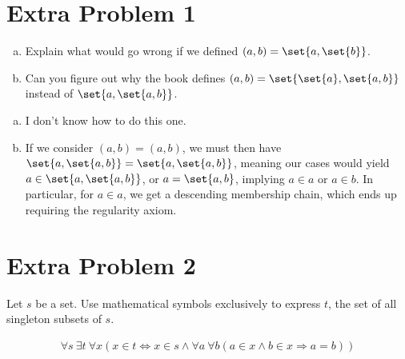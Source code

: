 \documentclass[10pt]{mypackage}
\begin{document}
\section{Extra Problem 1}%
\begin{problem}\hfill
  \begin{enumerate}[(a)]
    \item Explain what would go wrong if we defined $(a,b) = \set{a,\set{b}}$.
    \item Can you figure out why the book defines $(a,b) = \set{\set{a},\set{a,b}}$ instead of $\set{a,\set{a,b}}$.
  \end{enumerate}
\end{problem}
\begin{solution}\hfill
  \begin{enumerate}[(a)]
    \item I don't know how to do this one.
    \item If we consider $(a,b) = (a,b)$, we must then have $\set{a,\set{a,b}} = \set{a,\set{a,b}}$, meaning our cases would yield $a\in \set{a,\set{a,b}}$, or $a = \set{a,b}$, implying $a\in a$ or $a\in b$. In particular, for $a\in a$, we get a descending membership chain, which ends up requiring the regularity axiom.
  \end{enumerate}
\end{solution}
\section{Extra Problem 2}%
\begin{problem}
  Let $s$ be a set. Use mathematical symbols exclusively to express $t$, the set of all singleton subsets of $s$.
\end{problem}
\begin{solution}
  \begin{align*}
    \forall s\:\exists t\:\forall x\left(x\in t \Leftrightarrow x\in s \wedge \forall a\:\forall b\left(a\in x \wedge b\in x \Rightarrow a = b\right)\right)
  \end{align*}
\end{solution}
\end{document}
